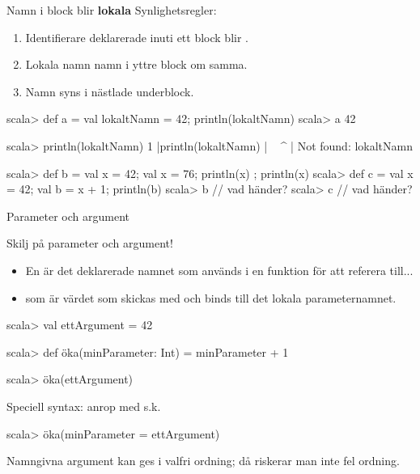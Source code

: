 \begin{Slide}{Namn i block blir \textbf{lokala}}
Synlighetsregler:
\begin{enumerate}
\item Identifierare deklarerade inuti ett block blir .

\item Lokala namn  namn i yttre block om samma.


\item Namn syns i nästlade underblock.

\end{enumerate}

\begin{REPL}
scala> def a = { val lokaltNamn = 42; println(lokaltNamn) }
scala> a 
42

scala> println(lokaltNamn)                                                                                                                  
1 |println(lokaltNamn)
  |        ^^^^^^^^^^
  |        Not found: lokaltNamn

scala> def b = { val x = 42; { val x = 76; println(x) }; println(x) }
scala> def c = { val x = 42; { val b = x + 1; println(b) } }
scala> b  // vad händer?
scala> c  // vad händer?
\end{REPL}

\end{Slide}


\begin{Slide}{Parameter och argument}

Skilj på parameter och argument!
\begin{itemize}
\item En  är det deklarerade namnet som används  i en funktion för att referera till...

\item {} som är värdet som skickas med  och binds till det lokala parameternamnet.

\end{itemize}


\begin{REPLnonum}
scala> val ettArgument = 42

scala> def öka(minParameter: Int) = minParameter + 1

scala> öka(ettArgument)
\end{REPLnonum}


Speciell syntax: anrop med s.k. 
\begin{REPLnonum}
scala> öka(minParameter = ettArgument)
\end{REPLnonum}
{\SlideFontSmall Namngivna argument kan ges i valfri ordning; då riskerar man inte fel ordning.}

\end{Slide}

